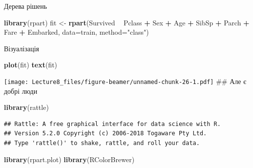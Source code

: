 \documentclass[ignorenonframetext,]{beamer}
\newenvironment{Shaded}{\begin{snugshade}}{\end{snugshade}}
\newcommand{\DataTypeTok}[1]{\textcolor[rgb]{0.13,0.29,0.53}{#1}}
\newcommand{\KeywordTok}[1]{\textcolor[rgb]{0.13,0.29,0.53}{\textbf{#1}}}
\newcommand{\NormalTok}[1]{#1}
\newcommand{\OperatorTok}[1]{\textcolor[rgb]{0.81,0.36,0.00}{\textbf{#1}}}
\newcommand{\StringTok}[1]{\textcolor[rgb]{0.31,0.60,0.02}{#1}}
\begin{document}
\begin{frame}[fragile]{Дерева рішень}
\protect\hypertarget{ux434ux435ux440ux435ux432ux430-ux440ux456ux448ux435ux43dux44c}{}

\begin{Shaded}
\begin{Highlighting}[]
\KeywordTok{library}\NormalTok{(rpart)}
\NormalTok{fit <-}\StringTok{ }\KeywordTok{rpart}\NormalTok{(Survived }\OperatorTok{~}\StringTok{ }\NormalTok{Pclass }\OperatorTok{+}\StringTok{ }\NormalTok{Sex }\OperatorTok{+}\StringTok{ }\NormalTok{Age }\OperatorTok{+}\StringTok{ }\NormalTok{SibSp }\OperatorTok{+}\StringTok{ }\NormalTok{Parch }\OperatorTok{+}\StringTok{ }\NormalTok{Fare }\OperatorTok{+}\StringTok{ }\NormalTok{Embarked,}
               \DataTypeTok{data=}\NormalTok{train,}
               \DataTypeTok{method=}\StringTok{"class"}\NormalTok{)}
\end{Highlighting}
\end{Shaded}

\end{frame}

\begin{frame}[fragile]{Візуалізація}
\protect\hypertarget{ux432ux456ux437ux443ux430ux43bux456ux437ux430ux446ux456ux44f}{}

\begin{Shaded}
\begin{Highlighting}[]
\KeywordTok{plot}\NormalTok{(fit)}
\KeywordTok{text}\NormalTok{(fit)}
\end{Highlighting}
\end{Shaded}

\texttt{[image: Lecture8\_files/figure-beamer/unnamed-chunk-26-1.pdf]}
\#\# Але є добрі люди

\begin{Shaded}
\begin{Highlighting}[]
\KeywordTok{library}\NormalTok{(rattle)}
\end{Highlighting}
\end{Shaded}

\begin{verbatim}
## Rattle: A free graphical interface for data science with R.
## Version 5.2.0 Copyright (c) 2006-2018 Togaware Pty Ltd.
## Type 'rattle()' to shake, rattle, and roll your data.
\end{verbatim}

\begin{Shaded}
\begin{Highlighting}[]
\KeywordTok{library}\NormalTok{(rpart.plot)}
\KeywordTok{library}\NormalTok{(RColorBrewer)}
\end{Highlighting}
\end{Shaded}

\end{frame}
\end{document}
